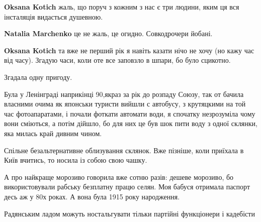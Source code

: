 \begin{itemize}
\begin{itemize}
\textbf{Oksana Kotich} жаль, що поруч з кожним з нас є три людини, яким ця вся інсталяція видасться душевною.

 
\textbf{Natalia Marchenko} це не жаль, це огидно. Совкодрочери йобані.

 
\textbf{Oksana Kotich} та вже не перший рік я навіть казати нічо не хочу (но
кажу час від часу). Згадую часи, коли оте все заповзло в шпари, бо було
сцикотно.
\end{itemize}

 
Згадала одну пригоду.

Була у Ленінграді наприкінці 90,якраз за рік до розпаду Союзу, так от бачила
власними очима як японськи туристи вийшли с автобусу, з крутяцкими на той час
фотоапаратами, і почали фоткати автомати води, я спочатку незрозуміла чому вони
сміються, а потім дійшло, бо для них це був шок пити воду з одної склянки, яка
милась край дивним чином.


 

Спільне безальтернативне облизування склянок. Вже пізніше, коли приїхала в Київ
вчитись, то носила із собою свою чашку.

А про найкраще морозиво говорила вже сотню разів: дешеве морозиво, бо
використовували рабську безплатну працю селян. Моя бабуся отримала паспорт десь
аж у 80х роках. А вона була 1915 року народження.

Радянським ладом можуть ностальгувати тільки партійні функціонери і кадебісти


\end{itemize}
